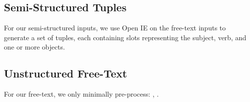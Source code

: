\subsection{Semi-Structured Tuples}
\label{sec:tuples}

For our semi-structured inputs, we use Open IE  \cite{Banko2007OpenIE} on the free-text inputs to generate a set of tuples, each containing  slots representing the subject, verb, and one or more objects.    
 

\subsection{Unstructured Free-Text}
\label{sec:freetext}

For our free-text, we only minimally pre-process: , .